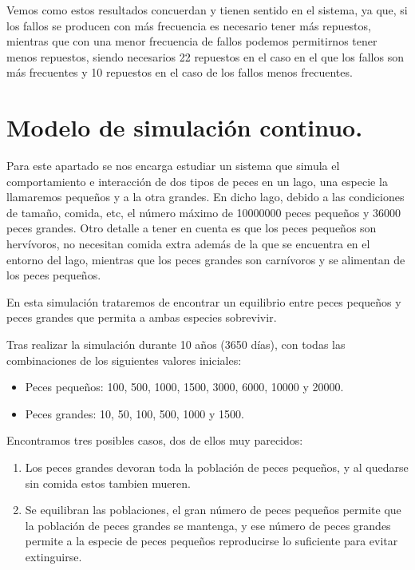 \documentclass[12pt, spanish]{article}
\begin{document}
Vemos como estos resultados concuerdan y tienen sentido en el sistema, ya que, si los fallos se producen con más frecuencia es necesario tener más repuestos, mientras que con una menor frecuencia de fallos podemos permitirnos tener menos repuestos, siendo necesarios 22 repuestos en el caso en el que los fallos son más frecuentes y 10 repuestos en el caso de los fallos menos frecuentes.


\newpage

\section{Modelo de simulación continuo.}

Para este apartado se nos encarga estudiar un sistema que simula el comportamiento e interacción de dos tipos de peces en un lago, una especie la llamaremos pequeños y a la otra grandes. En dicho lago, debido a las condiciones de tamaño, comida, etc, el número máximo de 10000000 peces pequeños y 36000 peces grandes. Otro detalle a tener en cuenta es que los peces pequeños son hervívoros, no necesitan comida extra además de la que se encuentra en el entorno del lago, mientras que los peces grandes son carnívoros y se alimentan de los peces pequeños.

En esta simulación trataremos de encontrar un equilibrio entre peces pequeños y peces grandes que permita a ambas especies sobrevivir.

Tras realizar la simulación durante 10 años (3650 días), con todas las combinaciones de los siguientes valores iniciales:

\begin{itemize}
	\item Peces pequeños: 100, 500, 1000, 1500, 3000, 6000, 10000 y 20000.
	\item Peces grandes: 10, 50, 100, 500, 1000 y 1500.
\end{itemize}

Encontramos tres posibles casos, dos de ellos muy parecidos:

\begin{enumerate}
	\item Los peces grandes devoran toda la población de peces pequeños, y al quedarse sin comida estos tambien mueren.
	\item Se equilibran las poblaciones, el gran número de peces pequeños permite que la población de peces grandes se mantenga, y ese número de peces grandes permite a la especie de peces pequeños reproducirse lo suficiente para evitar extinguirse.
\end{enumerate}
\end{document}
